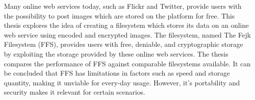




Many online web services today, such as Flickr and Twitter, provide users with the possibility to post images which are stored on the platform for free. This thesis explores the idea of creating a filesystem which stores its data on an online web service using encoded and encrypted images. The filesystem, named The Fejk Filesystem (FFS), provides users with free, deniable, and cryptographic storage by exploiting the storage provided by these online web services. The thesis compares the performance of FFS against comparable filesystems available. It can be concluded that FFS has limitations in factors such as speed and storage quantity, making it unviable for every-day usage. However, it's portability and security makes it relevant for certain scenarios.

